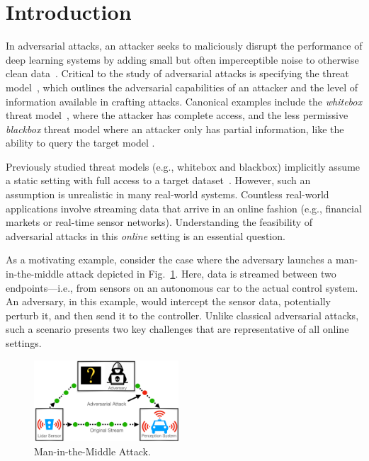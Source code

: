 \section{Introduction}


In adversarial attacks, an attacker seeks to maliciously disrupt the performance of deep learning systems by adding small but often imperceptible noise to otherwise clean data~\citep{szegedy2013intriguing,goodfellow2014explaining}. Critical to the study of adversarial attacks is specifying the threat model~\cite{akhtar2018threat}, which outlines the adversarial capabilities of an attacker and the level of information available in crafting attacks. Canonical examples include the \textit{whitebox} threat model~\cite{madry2017towards}, where the attacker has complete access, and the less permissive \textit{blackbox} threat model where an attacker only has partial information, like the ability to query the target model \citep{chen2017zoo,ilyas2017query,papernot2016transferability}. 

Previously studied threat models (e.g., whitebox and blackbox) implicitly assume a static setting with full access to a target dataset~\citep{tramer2017ensemble}. However, such an assumption is unrealistic in many real-world systems. Countless real-world applications involve streaming data that arrive in an online fashion (e.g., financial markets or real-time sensor networks). Understanding the feasibility of adversarial attacks in this {\em online} setting is an essential question. 

As a motivating example, consider the case where the adversary launches a man-in-the-middle attack depicted in Fig.~\ref{fig:man_in_the_middle}. Here, data is streamed between two endpoints---i.e., from sensors on an autonomous car to the actual control system. 
An adversary, in this example, would intercept the sensor data, potentially perturb it, and then send it to the controller. Unlike classical adversarial attacks, such a scenario presents two key challenges that are representative of all online settings. 

\begin{figure}
  \vspace{-8pt}
    \includegraphics[width=0.48\textwidth]{Figures/man_in_the_middle_attack_2.pdf}
  \vspace{-2pt}
\caption{Man-in-the-Middle Attack.}
\label{fig:man_in_the_middle}
\end{figure}

